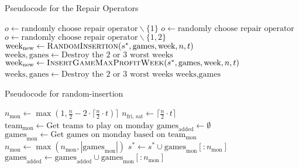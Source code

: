 \documentclass[12pt]{article}
\begin{document}
\begin{algorithm}
    \caption{Pseudocode for the Repair Operators}
    \begin{algorithmic}[1] 
                \State $o\leftarrow \text{randomly choose repair operator}\backslash\{1\}$ 
            \Else
                \State $o\leftarrow \text{randomly choose repair operator}$ 
            \EndIf
                \State $o\leftarrow \text{randomly choose repair operator}\backslash\{1, 2\}$ 
            \EndIf
                    \State $\text{week}_{\text{new}}\leftarrow \Call{RandomInsertion}{s^*, \text{games}, \text{week}, n, t}$
                \EndFor
                \State $\text{weeks}, \text{ganes}\leftarrow \text{Destroy the 2 or 3 worst weeks}$
                    \State $\text{week}_{\text{new}}\leftarrow \Call{InsertGameMaxProfitWeek}{s^*, \text{games}, \text{week}, n, t}$
                \EndFor
                    \State $\text{weeks}, \text{ganes}\leftarrow \text{Destroy the 2 or 3 worst weeks}$
            \EndIf
            \Return $\text{weeks}, \text{games}$
        \EndFunction
    \end{algorithmic}
\end{algorithm}

\begin{algorithm}
    \caption{Pseudocode for random-insertion}
    \begin{algorithmic}[1] 
            \State $n_{\text{mon}}\leftarrow \max(1, \frac{n}{2} - 2\cdot \lceil \frac{n}{2}\cdot t)\rceil$
            \State $n_{\text{fri, sat}}\leftarrow \lceil \frac{n}{2}\cdot t\rceil$
            \State $\text{team}_{\text{mon}}\leftarrow \text{Get teams to play on monday}$
            \State $\text{games}_{\text{added}} \leftarrow \emptyset$
                \State $\text{games}_{\text{mon}}\leftarrow \text{Get games on monday based on } \text{team}_{\text{mon}}$
                \State $n_{\text{mon}} \leftarrow \max(n_{\text{mon}}, |\text{games}_{\text{mon}}|)$
                \State $s^*\leftarrow s^*\cup \text{games}_{\text{mon}}[:n_{\text{mon}}]$
                \State $\text{games}_{\text{added}}\leftarrow \text{games}_{\text{added}}\cup \text{games}_{\text{mon}}[:n_{\text{mon}}]$
            \EndIf
        \EndFunction
    \end{algorithmic}
\end{algorithm}
\end{document}
